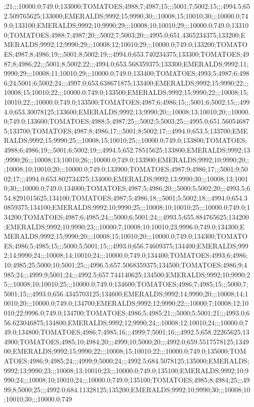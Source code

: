 ;21;;;10000.0;749.0;133000;TOMATOES;4988;7;4987;15;;;5001;7;5002;15;;;4994.5;652.509765625;133000;EMERALDS;9992;15;9990;30;;;10008;15;10010;30;;;10000.0;749.0;133100;EMERALDS;9992;10;9990;29;;;10008;10;10010;29;;;10000.0;749.0;133100;TOMATOES;4988;7;4987;20;;;5002;7;5003;20;;;4995.0;651.4365234375;133200;EMERALDS;9992;12;9990;29;;;10008;12;10010;29;;;10000.0;749.0;133200;TOMATOES;4987;8;4986;19;;;5001;8;5002;19;;;4994.0;653.740234375;133300;TOMATOES;4987;8;4986;22;;;5001;8;5002;22;;;4994.0;653.568359375;133300;EMERALDS;9992;11;9990;29;;;10008;11;10010;29;;;10000.0;749.0;133400;TOMATOES;4993;5;4987;6;4986;24;5001;6;5002;24;;;4997.0;653.638671875;133400;EMERALDS;9992;15;9990;22;;;10008;15;10010;22;;;10000.0;749.0;133500;EMERALDS;9992;15;9990;22;;;10008;15;10010;22;;;10000.0;749.0;133500;TOMATOES;4987;6;4986;15;;;5001;6;5002;15;;;4994.0;653.30078125;133600;EMERALDS;9992;13;9990;20;;;10008;13;10010;20;;;10000.0;749.0;133600;TOMATOES;4988;5;4987;25;;;5002;5;5003;25;;;4995.0;651.560546875;133700;TOMATOES;4987;8;4986;17;;;5001;8;5002;17;;;4994.0;653.5;133700;EMERALDS;9992;15;9990;25;;;10008;15;10010;25;;;10000.0;749.0;133800;TOMATOES;4988;6;4986;19;;;5001;6;5002;19;;;4994.5;652.78515625;133800;EMERALDS;9992;13;9990;26;;;10008;13;10010;26;;;10000.0;749.0;133900;EMERALDS;9992;10;9990;20;;;10008;10;10010;20;;;10000.0;749.0;133900;TOMATOES;4987;9;4986;17;;;5001;9;5002;17;;;4994.0;653.802734375;134000;EMERALDS;9992;13;9990;30;;;10008;13;10010;30;;;10000.0;749.0;134000;TOMATOES;4987;5;4986;20;;;5000;5;5002;20;;;4993.5;654.8291015625;134100;TOMATOES;4987;5;4986;18;;;5001;5;5002;18;;;4994.0;654.30859375;134100;EMERALDS;9992;10;9990;25;;;10008;10;10010;25;;;10000.0;749.0;134200;TOMATOES;4987;6;4985;24;;;5000;6;5001;24;;;4993.5;655.884765625;134200;EMERALDS;9992;10;9990;23;;;10000;7;10008;10;10010;23;9996.0;749.0;134300;EMERALDS;9992;15;9990;20;;;10008;15;10010;20;;;10000.0;749.0;134300;TOMATOES;4986;5;4985;15;;;5000;5;5001;15;;;4993.0;656.74609375;134400;EMERALDS;9992;14;9990;24;;;10008;14;10010;24;;;10000.0;749.0;134400;TOMATOES;4993;6;4986;10;4985;25;5000;10;5001;25;;;4996.5;657.5068359375;134500;TOMATOES;4986;9;4985;24;;;4999;9;5001;24;;;4992.5;657.744140625;134500;EMERALDS;9992;10;9990;25;;;10008;10;10010;25;;;10000.0;749.0;134600;TOMATOES;4986;7;4985;15;;;5000;7;5001;15;;;4993.0;656.4345703125;134600;EMERALDS;9992;14;9990;20;;;10008;14;10010;20;;;10000.0;749.0;134700;EMERALDS;9992;12;9990;22;;;10000;7;10008;12;10010;22;9996.0;749.0;134700;TOMATOES;4986;5;4985;21;;;5000;5;5001;21;;;4993.0;656.623046875;134800;EMERALDS;9992;12;9990;24;;;10008;12;10010;24;;;10000.0;749.0;134800;TOMATOES;4986;7;4985;16;;;4999;7;5001;16;;;4992.5;658.22265625;134900;TOMATOES;4985;10;4984;20;;;4999;10;5000;20;;;4992.0;659.5517578125;134900;EMERALDS;9992;15;9990;22;;;10008;15;10010;22;;;10000.0;749.0;135000;TOMATOES;4986;9;4985;24;;;4999;9;5000;24;;;4992.5;684.5078125;135000;EMERALDS;9992;13;9990;23;;;10008;13;10010;23;;;10000.0;749.0;135100;EMERALDS;9992;10;9990;24;;;10008;10;10010;24;;;10000.0;749.0;135100;TOMATOES;4985;8;4984;25;;;4999;8;5000;25;;;4992.0;684.11328125;135200;EMERALDS;9992;10;9990;30;;;10008;10;10010;30;;;10000.0;749